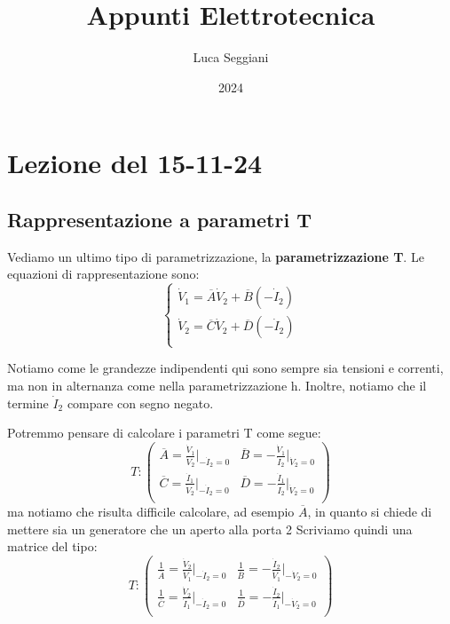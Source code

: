 \documentclass[a4paper,11pt]{article}
\title{Appunti Elettrotecnica}
\author{Luca Seggiani}
\date{2024}
\begin{document}
\section{Lezione del 15-11-24}

\thispagestyle{empty}
\pagestyle{fancy}

\subsection{Rappresentazione a parametri T}
Vediamo un ultimo tipo di parametrizzazione, la \textbf{parametrizzazione T}.
Le equazioni di rappresentazione sono:
\[
	\begin{cases}
		\dot{V}_1	= \overline{A} \dot{V}_2 + \overline{B} ( - \dot{I}_2 ) \\ 
		\dot{V}_2	= \overline{C} \dot{V}_2 + \overline{D} ( - \dot{I}_2 ) \\ 
	\end{cases}
\]

Notiamo come le grandezze indipendenti qui sono sempre sia tensioni e correnti, ma non in alternanza come nella parametrizzazione h.
Inoltre, notiamo che il termine $\dot{I}_2$ compare con segno negato.

Potremmo pensare di calcolare i parametri T come segue:
$$
T:
\begin{pmatrix}
	\overline{A} = \frac{\dot{V}_1}{\dot{V}_2} \Big|_{-\dot{I}_2 = 0}	& \overline{B} = -\frac{\dot{V}_1}{\dot{I}_2} \Big|_{\dot{V}_2 = 0} \\
	\overline{C} = \frac{\dot{I}_1}{\dot{V}_2} \Big|_{-\dot{I}_2 = 0}	& \overline{D} = -\frac{\dot{I}_1}{\dot{I}_2} \Big|_{\dot{V}_2 = 0} \\
\end{pmatrix}
$$
ma notiamo che risulta difficile calcolare, ad esempio $\overline{A}$, in quanto si chiede di mettere sia un generatore che un aperto alla porta 2 
Scriviamo quindi una matrice del tipo:
$$
T:
\begin{pmatrix}
	\frac{1}{\overline{A}} = \frac{\dot{V}_2}{\dot{V}_1} \Big|_{- \dot{I}_2 = 0} & \frac{1}{\overline{B}} = -\frac{\dot{I}_2}{\dot{V}_1} \Big|_{- \dot{V}_2 = 0} \\
	\frac{1}{\overline{C}} = \frac{\dot{V}_2}{\dot{I}_1} \Big|_{- \dot{I}_2 = 0} & \frac{1}{\overline{D}} = -\frac{\dot{I}_2}{\dot{I}_1} \Big|_{- \dot{V}_2 = 0} \\
\end{pmatrix}
$$
\end{document}

